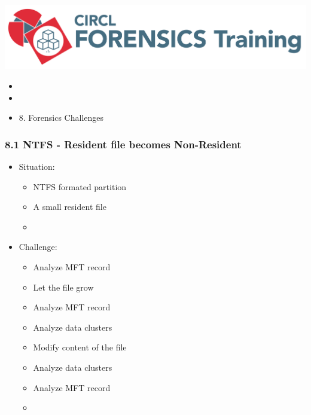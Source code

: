 %
%



\begin{frame}
    \includegraphics[scale=0.3]{images/logo-circl-Forensics.png}
    \begin{itemize}
        \item[]
        \item[]
        \item[] 8. Forensics Challenges
    \end{itemize}
\end{frame}


\begin{frame}[fragile]
  \frametitle{8.1 NTFS - Resident file becomes Non-Resident}
  \begin{itemize}
    \item Situation:
    \begin{itemize}
      \item NTFS formated partition
      \item A small resident file
      \item[]
    \end{itemize}
    \item Challenge:
    \begin{itemize}
      \item Analyze MFT record
      \item Let the file grow
      \item Analyze MFT record
      \item Analyze data clusters
      \item Modify content of the file
      \item Analyze data clusters
      \item Analyze MFT record
      \item[]
    \end{itemize}
  \end{itemize}
\end{frame}


